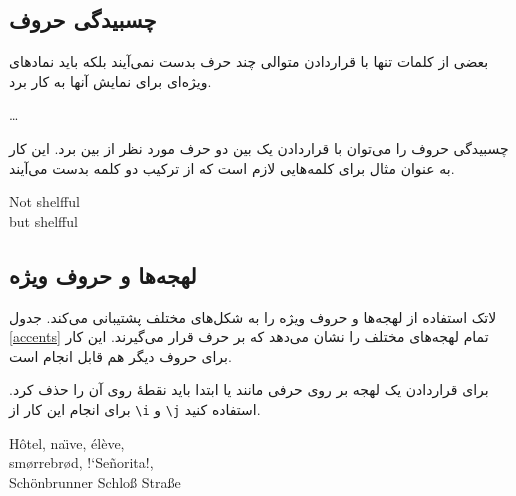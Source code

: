 \subsection{چسبیدگی حروف}
بعضی از کلمات تنها با قراردادن متوالی چند حرف بدست نمی‌آیند بلکه باید نمادهای ویژه‌ای برای نمایش آنها به کار برد.

\begin{code}
{\large {}\ldots}\quad
{}
\end{code}

چسبیدگی حروف را می‌توان با قراردادن یک 
بین دو حرف مورد نظر از بین برد. این کار به عنوان مثال برای کلمه‌هایی لازم است که از ترکیب دو کلمه بدست می‌آیند.

\begin{example}
\Large Not shelfful\\
but shelf\mbox{}ful
\end{example}

\subsection{لهجه‌ها و حروف ویژه}

لاتک استفاده از لهجه‌ها و حروف ویژه را به شکل‌های مختلف پشتیبانی می‌کند. جدول 
\ref{accents}
تمام لهجه‌های مختلف را نشان می‌دهد که بر حرف 
قرار می‌گیرند. این کار برای حروف دیگر هم قابل انجام است. 

برای قراردادن یک لهجه بر روی حرفی مانند 
 یا 
ابتدا باید نقطهٔ روی آن را حذف کرد. برای انجام این کار از 
\verb|\i| و \verb|\j|
استفاده کنید.

\begin{example}
H\^otel, na\"\i ve, \'el\`eve,\\ 
sm\o rrebr\o d, !`Se\~norita!,\\
Sch\"onbrunner Schlo\ss{} 
Stra\ss e
\end{example}

